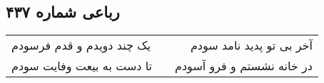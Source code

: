 \begin{center}
\section*{رباعی شماره ۴۳۷}
\label{sec:sh437}
\begin{longtable}{l p{0.5cm} r}
یک چند دویدم و قدم فرسودم
&&
آخر بی تو پدید نامد سودم
\\
تا دست به بیعت وفایت سودم
&&
در خانه نشستم و فرو آسودم
\\
\end{longtable}
\end{center}
